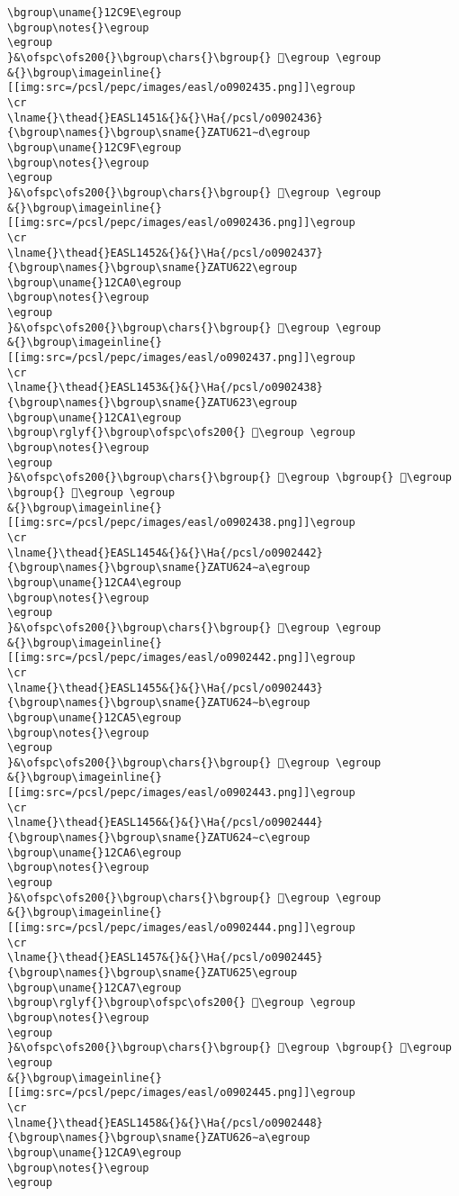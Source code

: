 \begin{verbatim}
\bgroup\uname{}12C9E\egroup
\bgroup\notes{}\egroup
\egroup
}&\ofspc\ofs200{}\bgroup\chars{}\bgroup{} 𒲞\egroup \egroup
&{}\bgroup\imageinline{}[[img:src=/pcsl/pepc/images/easl/o0902435.png]]\egroup
\cr
\lname{}\thead{}EASL1451&{}&{}\Ha{/pcsl/o0902436}{\bgroup\names{}\bgroup\sname{}ZATU621∼d\egroup
\bgroup\uname{}12C9F\egroup
\bgroup\notes{}\egroup
\egroup
}&\ofspc\ofs200{}\bgroup\chars{}\bgroup{} 𒲟\egroup \egroup
&{}\bgroup\imageinline{}[[img:src=/pcsl/pepc/images/easl/o0902436.png]]\egroup
\cr
\lname{}\thead{}EASL1452&{}&{}\Ha{/pcsl/o0902437}{\bgroup\names{}\bgroup\sname{}ZATU622\egroup
\bgroup\uname{}12CA0\egroup
\bgroup\notes{}\egroup
\egroup
}&\ofspc\ofs200{}\bgroup\chars{}\bgroup{} 𒲠\egroup \egroup
&{}\bgroup\imageinline{}[[img:src=/pcsl/pepc/images/easl/o0902437.png]]\egroup
\cr
\lname{}\thead{}EASL1453&{}&{}\Ha{/pcsl/o0902438}{\bgroup\names{}\bgroup\sname{}ZATU623\egroup
\bgroup\uname{}12CA1\egroup
\bgroup\rglyf{}\bgroup\ofspc\ofs200{} 𒲡\egroup \egroup
\bgroup\notes{}\egroup
\egroup
}&\ofspc\ofs200{}\bgroup\chars{}\bgroup{} 𒲣\egroup \bgroup{} 𒲢\egroup \bgroup{} 𒲡\egroup \egroup
&{}\bgroup\imageinline{}[[img:src=/pcsl/pepc/images/easl/o0902438.png]]\egroup
\cr
\lname{}\thead{}EASL1454&{}&{}\Ha{/pcsl/o0902442}{\bgroup\names{}\bgroup\sname{}ZATU624∼a\egroup
\bgroup\uname{}12CA4\egroup
\bgroup\notes{}\egroup
\egroup
}&\ofspc\ofs200{}\bgroup\chars{}\bgroup{} 𒲤\egroup \egroup
&{}\bgroup\imageinline{}[[img:src=/pcsl/pepc/images/easl/o0902442.png]]\egroup
\cr
\lname{}\thead{}EASL1455&{}&{}\Ha{/pcsl/o0902443}{\bgroup\names{}\bgroup\sname{}ZATU624∼b\egroup
\bgroup\uname{}12CA5\egroup
\bgroup\notes{}\egroup
\egroup
}&\ofspc\ofs200{}\bgroup\chars{}\bgroup{} 𒲥\egroup \egroup
&{}\bgroup\imageinline{}[[img:src=/pcsl/pepc/images/easl/o0902443.png]]\egroup
\cr
\lname{}\thead{}EASL1456&{}&{}\Ha{/pcsl/o0902444}{\bgroup\names{}\bgroup\sname{}ZATU624∼c\egroup
\bgroup\uname{}12CA6\egroup
\bgroup\notes{}\egroup
\egroup
}&\ofspc\ofs200{}\bgroup\chars{}\bgroup{} 𒲦\egroup \egroup
&{}\bgroup\imageinline{}[[img:src=/pcsl/pepc/images/easl/o0902444.png]]\egroup
\cr
\lname{}\thead{}EASL1457&{}&{}\Ha{/pcsl/o0902445}{\bgroup\names{}\bgroup\sname{}ZATU625\egroup
\bgroup\uname{}12CA7\egroup
\bgroup\rglyf{}\bgroup\ofspc\ofs200{} 𒲧\egroup \egroup
\bgroup\notes{}\egroup
\egroup
}&\ofspc\ofs200{}\bgroup\chars{}\bgroup{} 𒲧\egroup \bgroup{} 𒲨\egroup \egroup
&{}\bgroup\imageinline{}[[img:src=/pcsl/pepc/images/easl/o0902445.png]]\egroup
\cr
\lname{}\thead{}EASL1458&{}&{}\Ha{/pcsl/o0902448}{\bgroup\names{}\bgroup\sname{}ZATU626∼a\egroup
\bgroup\uname{}12CA9\egroup
\bgroup\notes{}\egroup
\egroup

\end{verbatim}
